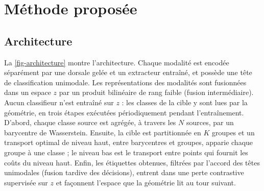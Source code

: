 \documentclass[11pt,a4paper]{article}
\theoremstyle{definition}
\theoremstyle{remark}
\begin{document}
\section{Méthode proposée}\label{sec-methode}

\subsection{Architecture}\label{sec-architecture}

La \cref{fig-architecture} montre l'architecture. Chaque modalité est encodée séparément par une dorsale gelée et un
extracteur entraîné, et possède une tête de classification unimodale. Les représentations des modalités sont fusionnées
dans un espace $z$ par un produit bilinéaire de rang faible (fusion intermédiaire). Aucun classifieur n'est entraîné sur
$z$ : les classes de la cible y sont lues par la géométrie, en trois étapes exécutées périodiquement pendant
l'entraînement. D'abord, chaque classe source est agrégée, à travers les $N$ sources, par un barycentre de Wasserstein.
Ensuite, la cible est partitionnée en $K$ groupes et un transport optimal de niveau haut, entre barycentres et groupes,
apparie chaque groupe à une classe ; le niveau bas est le transport entre points qui fournit les coûts du niveau haut.
Enfin, les étiquettes obtenues, filtrées par l'accord des têtes unimodales (fusion tardive des décisions), entrent dans
une perte contrastive supervisée sur $z$ et façonnent l'espace que la géométrie lit au tour suivant.
\end{document}
